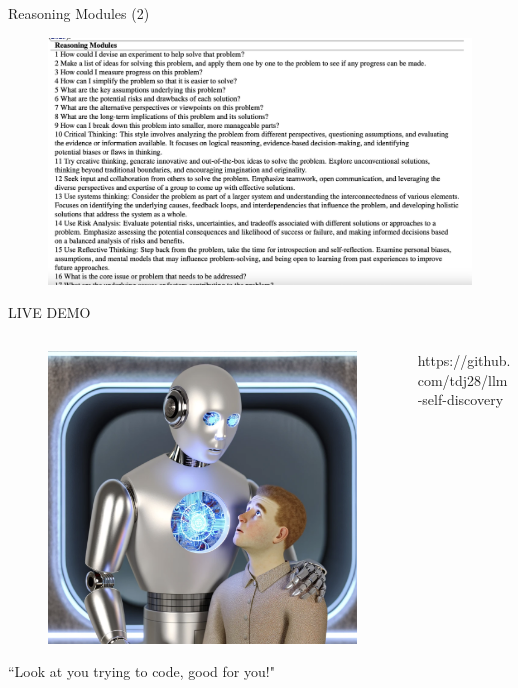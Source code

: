 \documentclass[aspectratio=169]{beamer}
\begin{document}
\begin{frame}{Reasoning Modules (2)}

\begin{figure}
    \centering
    \includegraphics[width=0.75\linewidth]{example_modules.png}
    
    
\end{figure}


\end{frame}


\begin{frame}{LIVE DEMO}

\begin{columns}
\begin{column}{0.5\textwidth}

    \vspace{3mm}

    \begin{figure}
    \centering
    \includegraphics[width=0.8\linewidth]{llm_friend.png}
    \end{figure}

``Look at you trying to code, good for you!"
\end{column}

\begin{column}{0.4\textwidth}
    https://github.com/tdj28/llm-self-discovery
\end{column}
    
\end{columns}

\end{frame}
\end{document}
